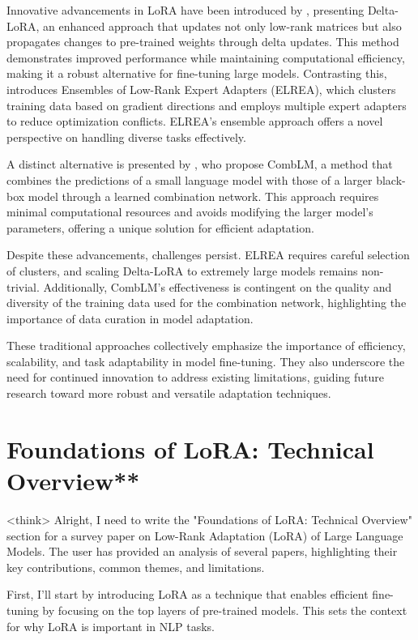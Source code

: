 \documentclass[conference]{IEEEtran}
\begin{document}
Innovative advancements in LoRA have been introduced by \cite{b3}, presenting Delta-LoRA, an enhanced approach that updates not only low-rank matrices but also propagates changes to pre-trained weights through delta updates. This method demonstrates improved performance while maintaining computational efficiency, making it a robust alternative for fine-tuning large models. Contrasting this, \cite{b4} introduces Ensembles of Low-Rank Expert Adapters (ELREA), which clusters training data based on gradient directions and employs multiple expert adapters to reduce optimization conflicts. ELREA's ensemble approach offers a novel perspective on handling diverse tasks effectively.

A distinct alternative is presented by \cite{b5}, who propose CombLM, a method that combines the predictions of a small language model with those of a larger black-box model through a learned combination network. This approach requires minimal computational resources and avoids modifying the larger model's parameters, offering a unique solution for efficient adaptation.

Despite these advancements, challenges persist. ELREA requires careful selection of clusters, and scaling Delta-LoRA to extremely large models remains non-trivial. Additionally, CombLM's effectiveness is contingent on the quality and diversity of the training data used for the combination network, highlighting the importance of data curation in model adaptation.

These traditional approaches collectively emphasize the importance of efficiency, scalability, and task adaptability in model fine-tuning. They also underscore the need for continued innovation to address existing limitations, guiding future research toward more robust and versatile adaptation techniques.

\section{Foundations of LoRA: Technical Overview**}
<think>
Alright, I need to write the "Foundations of LoRA: Technical Overview" section for a survey paper on Low-Rank Adaptation (LoRA) of Large Language Models. The user has provided an analysis of several papers, highlighting their key contributions, common themes, and limitations.

First, I'll start by introducing LoRA as a technique that enables efficient fine-tuning by focusing on the top layers of pre-trained models. This sets the context for why LoRA is important in NLP tasks.
\end{document}
